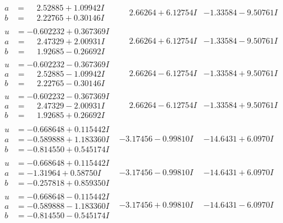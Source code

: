 \documentclass[1p]{elsarticle_modified}
\theoremstyle{definition}
\begin{document}
$$\begin{array}{c|c|c}
\begin{aligned}
a &= \phantom{-}2.52885 + 1.09942 I \\
b &= \phantom{-}2.22765 + 0.30146 I\end{aligned}
 & \phantom{-}2.66264 + 6.12754 I & -1.33584 - 9.50761 I \\ \hline\begin{aligned}
u &= -0.602232 + 0.367369 I \\
a &= \phantom{-}2.47329 + 2.00931 I \\
b &= \phantom{-}1.92685 - 0.26692 I\end{aligned}
 & \phantom{-}2.66264 + 6.12754 I & -1.33584 - 9.50761 I \\ \hline\begin{aligned}
u &= -0.602232 - 0.367369 I \\
a &= \phantom{-}2.52885 - 1.09942 I \\
b &= \phantom{-}2.22765 - 0.30146 I\end{aligned}
 & \phantom{-}2.66264 - 6.12754 I & -1.33584 + 9.50761 I \\ \hline\begin{aligned}
u &= -0.602232 - 0.367369 I \\
a &= \phantom{-}2.47329 - 2.00931 I \\
b &= \phantom{-}1.92685 + 0.26692 I\end{aligned}
 & \phantom{-}2.66264 - 6.12754 I & -1.33584 + 9.50761 I \\ \hline\begin{aligned}
u &= -0.668648 + 0.115442 I \\
a &= -0.589888 + 1.183360 I \\
b &= -0.814550 + 0.545174 I\end{aligned}
 & -3.17456 - 0.99810 I & -14.6431 + 6.0970 I \\ \hline\begin{aligned}
u &= -0.668648 + 0.115442 I \\
a &= -1.31964 + 0.58750 I \\
b &= -0.257818 + 0.859350 I\end{aligned}
 & -3.17456 - 0.99810 I & -14.6431 + 6.0970 I \\ \hline\begin{aligned}
u &= -0.668648 - 0.115442 I \\
a &= -0.589888 - 1.183360 I \\
b &= -0.814550 - 0.545174 I\end{aligned}
 & -3.17456 + 0.99810 I & -14.6431 - 6.0970 I \\ \hline\begin{aligned}

\end{aligned}
\end{array}$$
\end{document}
